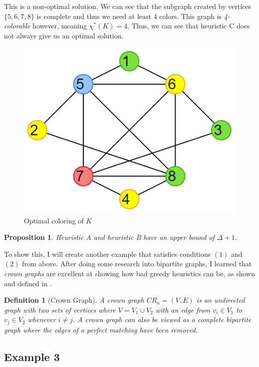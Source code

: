 \documentclass{article}
\newtheorem*{definition}{Definition}
\newtheorem{prop}{Proposition}
\begin{document}
This is a non-optimal solution. We can see that the subgraph created by vertices \(\{5, 6, 7, 8\}\) is complete and thus we need at least 4 colors. This graph is \emph{4-colorable} however, meaning \(\chi^{*}(K) = 4\). Thus, we can see that heuristic C does not always give us an optimal solution.

\begin{figure}[H]
\centering
\includegraphics[scale=0.38]{images/mis-3.png}
\caption{Optimal coloring of \(K\)}
\end{figure}

\begin{prop}
Heuristic A and heuristic B have an upper bound of \(\Delta + 1\).
\end{prop}

To show this, I will create another example that satisfies conditions \((1)\) and \((2)\) from above. After doing some research into bipartite graphs, I learned that \emph{crown graphs} are excellent at showing how bad greedy heuristics can be, as shown and defined in \cite{kordecki}.

\begin{definition}[Crown Graph]
A crown graph \(CR_n = (V, E)\) is an undirected graph with two sets of vertices where \(V = V_1 \cup V_2\) with an edge from \(v_i \in V_1\) to \(v_{j} \in V_2\) whenever \(i \neq j\). A crown graph can also be viewed as a complete bipartite graph where the edges of a perfect matching have been removed.
\end{definition}

\subsection*{Example 3}
\end{document}
